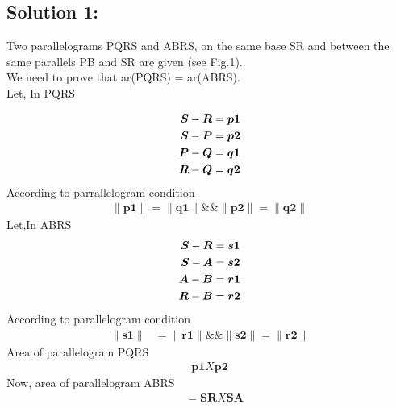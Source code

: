 \documentclass{article}
\begin{document}
\begin{multicols}{2}
\section*{\textbf{Solution 1:}}
\begin{flushleft}
Two parallelograms PQRS and ABRS, on the same base SR and between the same parallels PB and SR are given (see Fig.1).\\
We need to prove that ar(PQRS) = ar(ABRS).\\
Let, In PQRS 
\end{flushleft}
\begin{align}
           \boldsymbol{S}-\boldsymbol{R}&=\boldsymbol{p1}\hfill \\
           \boldsymbol{S}-\boldsymbol{P}&=\boldsymbol{p2}\hfill \\
           \boldsymbol{P}-\boldsymbol{Q} &=\boldsymbol{q1}\hfill \\
           \boldsymbol{R}-\boldsymbol{Q}&=\boldsymbol{q2}
\end{align}
 According to parrallelogram condition \\
\begin{align}
\lVert{\textbf{p1}}\rVert =\lVert{\textbf{q1}}\rVert \&\& \lVert{\textbf{p2}}\rVert =\lVert{\textbf{q2}}\rVert
\end{align}
\hspace{-4cm}Let,In ABRS
\begin{align}
           \boldsymbol{S}-\boldsymbol{R}&=\boldsymbol{s1} \hfill \\
           \boldsymbol{S}-\boldsymbol{A}&=\boldsymbol{s2} \hfill \\
           \boldsymbol{A}-\boldsymbol{B}&=\boldsymbol{r1} \hfill \\
           \boldsymbol{R}-\boldsymbol{B}&=\boldsymbol{r2}
\end{align} 
\hspace{-1cm}According to parallelogram condition 
\begin{align}
\lVert{\textbf{s1}}\rVert &=\lVert{\textbf{r1}}\rVert \&\& \lVert{\textbf{s2}}\rVert =\lVert{\textbf{r2}}\rVert
\end{align}
\hspace{-2cm}Area of parallelogram PQRS
\begin{align}
\boldsymbol{p1} X \boldsymbol{p2}       
\end{align}        
\hspace{-1cm}Now, area of parallelogram ABRS
\begin{align}
&=\boldsymbol{SR} X \boldsymbol{SA}

\end{align}
\end{multicols}
\end{document}
